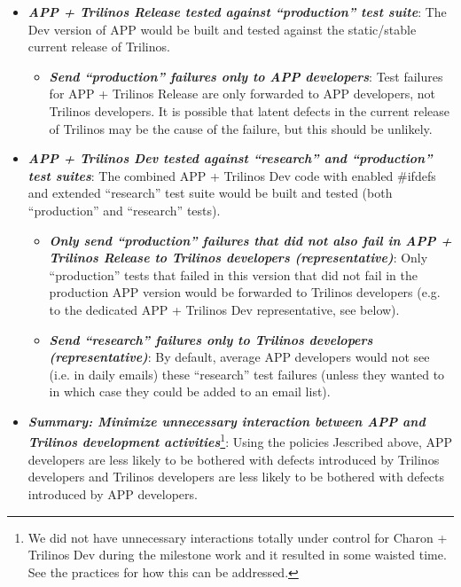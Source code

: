 \documentclass[pdf,ps2pdf,11pt]{SANDreport}
\begin{document}
  \begin{itemize}

  {}\item\textit{\textbf{APP + Trilinos Release tested against ``production''
  test suite}}: The Dev version of APP would be built and tested against the
  static/stable current release of Trilinos.

    \begin{itemize}

    {}\item\textit{\textbf{Send ``production'' failures only to APP
    developers}}: Test failures for APP + Trilinos Release are only forwarded
    to APP developers, not Trilinos developers.  It is possible that latent
    defects in the current release of Trilinos may be the cause of the
    failure, but this should be unlikely.

    \end{itemize}

  {}\item\textit{\textbf{APP + Trilinos Dev tested against ``research'' and
  ``production'' test suites}}: The combined APP + Trilinos Dev code with
  enabled {}\#ifdefs and extended ``research'' test suite would be built and
  tested (both ``production'' and ``research'' tests).

    \begin{itemize}

    {}\item\textit{\textbf{Only send ``production'' failures that did not also
    fail in APP + Trilinos Release to Trilinos developers (representative)}}:
    Only ``production'' tests that failed in this version that did not fail in
    the production APP version would be forwarded to Trilinos developers
    (e.g. to the dedicated APP + Trilinos Dev representative, see below).

    {}\item\textit{\textbf{Send ``research'' failures only to Trilinos
    developers (representative)}}: By default, average APP developers would
    not see (i.e. in daily emails) these ``research'' test failures (unless
    they wanted to in which case they could be added to an email list).

    \end{itemize}

  {}\item\textit{\textbf{Summary: Minimize unnecessary interaction between APP
  and Trilinos development activities}}\footnote{We did not have unnecessary
  interactions totally under control for Charon + Trilinos Dev during the
  milestone work and it resulted in some waisted time.  See the practices for
  how this can be addressed.}: Using the policies Jescribed above, APP
  developers are less likely to be bothered with defects introduced by
  Trilinos developers and Trilinos developers are less likely to be bothered
  with defects introduced by APP developers.
                
  \end{itemize}
\end{document}
